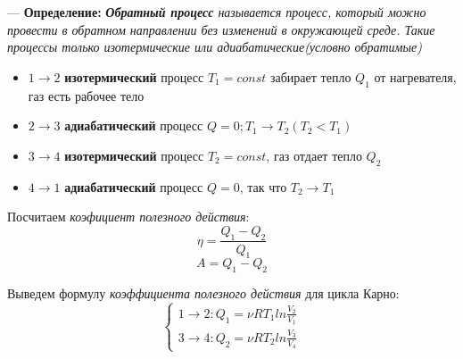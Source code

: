 \documentclass[12pt,a4paper]{report}
\begin{document}
\begin{center}
\end{center}
--- \textbf{Определение:} \textit{\textbf{Обратный процесс} называется процесс, который можно провести в обратном направлении без изменений в окружающей среде. Такие процессы только изотермические или адиабатические(условно обратимые)}
\begin{itemize}
    \item $1 \to 2$ \textbf{изотермический} процесс $T_1 = const$ забирает тепло $Q_1$ от нагревателя, газ есть рабочее тело
    \item $2 \to 3$ \textbf{адиабатический} процесс $ Q = 0 ; T_1 \to T_2(T_2 < T_1)$
    \item $3 \to 4$ \textbf{изотермический} процесс $T_2 = const$, газ отдает тепло $Q_2$
    \item $4 \to 1$ \textbf{адиабатический} процесс $Q = 0$, так что $T_2 \to T_1$
\end{itemize}
Посчитаем \textit{коэфициент полезного действия}:
\[ \eta = \frac{Q_1 - Q_2}{Q_1}\]
\[A = Q_1 - Q_2 \]

Выведем формулу \textit{коэффициента полезного действия} для цикла Карно:
\begin{equation*}
    \begin{cases}
        1 \to 2: Q_1 = \nu RT_1 ln{\frac{V_2}{V_1}}
        \\
        3 \to 4: Q_2 = \nu RT_2 ln{\frac{V_3}{V_4}}
    \end{cases}
\end{equation*}
\end{document}
